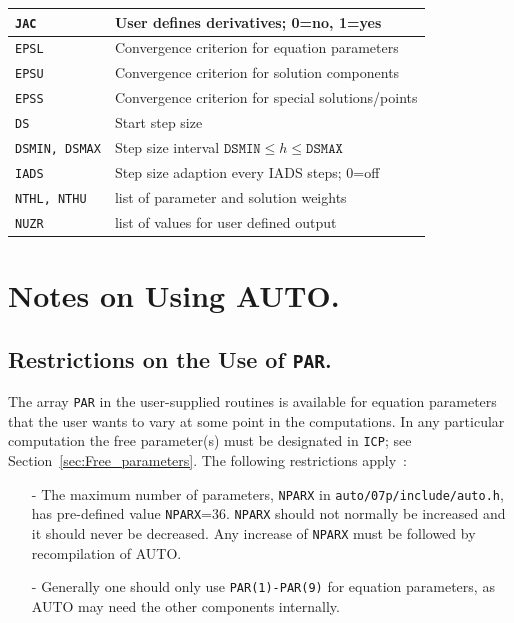 \documentclass[12pt]{report}
\begin{document}
\begin{tabular}{|l|l|}
{\tt JAC}  & User defines derivatives; 0=no, 1=yes \\
\hline
{\tt EPSL} & Convergence criterion for equation parameters \\
{\tt EPSU} & Convergence criterion for solution components \\
{\tt EPSS} & Convergence criterion for special solutions/points \\
\hline
{\tt DS}  & Start step size \\
{\tt DSMIN, DSMAX} & Step size interval $\mathtt{DSMIN} \leq h \leq \mathtt{DSMAX}$ \\
{\tt IADS} & Step size adaption every IADS steps; 0=off \\
\hline
{\tt NTHL, NTHU} & list of parameter and solution weights \\
\hline
{\tt NUZR} & list of values for user defined output\\
\hline
\end{tabular}

 

\chapter{ Notes on Using {\cal AUTO}.}  \label{ch:Notes_on_Using_AUTO}
\section{ Restrictions on the Use of {\tt PAR}.} \label{sec:Restrictions_on_PAR}
The array {\tt PAR} in the user-supplied routines is available
for equation parameters that the user wants to vary at some point
in the computations.
In any particular computation the free parameter(s) must be designated
in {\tt ICP}; see Section~\ref{sec:Free_parameters}.
The following restrictions apply~:

\begin{itemize}
\item[-]
  The maximum number of parameters, {\tt NPARX} in {\tt auto/07p/include/auto.h},
  has pre-defined value {\tt NPARX}=36.  {\tt NPARX} should not normally be increased
  and it should never be decreased.
  Any increase of {\tt NPARX} must be followed by recompilation of {\cal AUTO}.
\item[-]
  Generally one should only use {\tt PAR(1)-PAR(9)} for equation parameters,
  as {\cal AUTO} may need the other components internally.  
\end{itemize}
\end{document}
